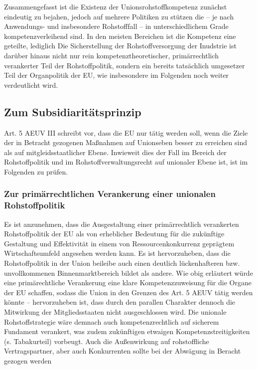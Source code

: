 \documentclass[12pt,a4paper,oneside]{book} %
\begin{document}
	Zusammengefasst ist die Existenz der Unionsrohstoffkompetenz zunächst eindeutig zu bejahen, jedoch auf mehrere Politiken zu stützen die -- je nach Anwendungs- und insbesondere Rohstofffall -- in unterschiedlichem Grade kompetenzverleihend sind. In den meisten Bereichen ist die Kompetenz eine geteilte, lediglich %
	Die Sicherstellung der Rohstoffversorgung der Inudstrie ist darüber hinaus nicht nur rein kompetenztheoretischer, primärrechtlich verankerter Teil der Rohstoffpolitik, sondern ein bereits tatsächlich umgesetzer Teil der Organpolitik der EU, wie insbesondere im Folgenden noch weiter verdeutlicht wird.
	
	\subsection{Zum Subsidiaritätsprinzip}
	Art. 5 AEUV III schreibt vor, dass die EU nur tätig werden soll, wenn die Ziele der in Betracht gezogenen Maßnahmen auf Unionseben besser zu erreichen sind als auf mitgleidsstaatlicher Ebene. Inwieweit dies der Fall im Bereich der Rohstoffpolitik und im Rohstoffverwaltungsrecht auf unionaler Ebene ist, ist im Folgenden zu prüfen.
	

	
	
	\subsubsection{Zur primärrechtlichen Verankerung einer unionalen Rohstoffpolitik}
	Es ist anzunehmen, dass die Ausgestaltung einer primärrechtlich verankerten Rohstoffpolitik der EU als von erheblicher Bedeutung für die zukünftige Gestaltung und Effektivität in einem von Ressourcenkonkurrenz geprägtem Wirtschaftsumfeld angesehen werden kann. Es ist hervorzuheben, dass die Rohstoffpolitik in der Union beileibe auch einen deutlich lückenhafteren bzw. unvollkommenen Binnenmarktbereich bildet als andere.  Wie obig erläutert würde eine primärechtliche Verankerung eine klare Kompetenzzuweisung für die Organe der EU schaffen, sodass die Union in den Grenzen des Art. 5 AEUV tätig werden könnte -- hervorzuheben ist, dass durch den parallen Charakter dennoch die Mitwirkung der Mitgliedsstaaten nicht ausgeschlossen wird. Die unionale Rohstoffstrategie wäre demnach auch kompetenzrechtlich auf sicherem Fundament verankert, was zudem zukünftigen etwaigen Kompetenzstreitigkeiten (s. Tabakurteil) vorbeugt. Auch die Außenwirkung auf rohstoffliche Vertragspartner, aber auch Konkurrenten sollte bei der Abwägung in Beracht gezogen werden
	
\end{document}
